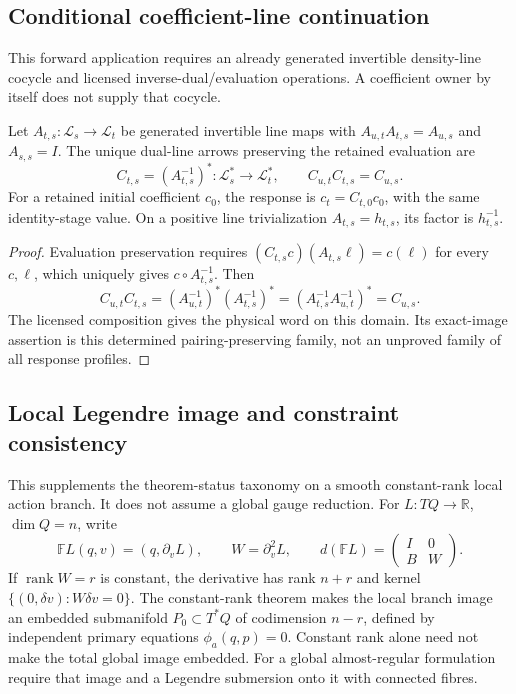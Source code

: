 \documentclass[11pt,a4paper]{article}
\begin{document}
\subsection{Conditional coefficient-line continuation}
\label{p3a:app:v166-coefficient-continuation}
This forward application requires an already generated invertible
density-line cocycle and licensed inverse-dual/evaluation operations. A
coefficient owner by itself does not supply that cocycle.

\begin{lemma}
\label{p3a:lem:v166-coefficient-dual-continuation}
Let \(A_{t,s}:\mathcal L_s\to\mathcal L_t\) be generated invertible
line maps with \(A_{u,t}A_{t,s}=A_{u,s}\) and \(A_{s,s}=I\). The
unique dual-line arrows preserving the retained evaluation are
\[
 C_{t,s}=(A_{t,s}^{-1})^*:\mathcal L_s^*\to\mathcal L_t^*,\qquad
 C_{u,t}C_{t,s}=C_{u,s}.
\]
For a retained initial coefficient \(c_0\), the response is
\(c_t=C_{t,0}c_0\), with the same identity-stage value. On a positive
line trivialization \(A_{t,s}=h_{t,s}\), its factor is \(h_{t,s}^{-1}\).
\end{lemma}
\begin{proof}
Evaluation preservation requires
\((C_{t,s}c)(A_{t,s}\ell)=c(\ell)\) for every \(c,\ell\), which
uniquely gives \(c\circ A_{t,s}^{-1}\). Then
\[
 C_{u,t}C_{t,s}
 =(A_{u,t}^{-1})^*(A_{t,s}^{-1})^*
 =(A_{t,s}^{-1}A_{u,t}^{-1})^*=C_{u,s}.
\]
The licensed composition gives the physical word on this domain. Its
exact-image assertion is this determined pairing-preserving family, not an
unproved family of all response profiles.
\end{proof}

\subsection{Local Legendre image and constraint consistency}
\label{p3a:app:v166-legendre-image}
This supplements the theorem-status taxonomy on a smooth constant-rank local
action branch. It does not assume a global gauge reduction.
For \(L:TQ\to\mathbb R\), \(\dim Q=n\), write
\[
 \mathbb FL(q,v)=(q,\partial_v L),\qquad
 W=\partial_v^2L,\qquad
 d(\mathbb FL)=\begin{pmatrix}I&0\\B&W\end{pmatrix}.
\]
If \(\operatorname{rank}W=r\) is constant, the derivative has rank
\(n+r\) and kernel \(\{(0,\delta v):W\delta v=0\}\). The
constant-rank theorem makes the local branch image an embedded submanifold
\(P_0\subset T^*Q\) of codimension \(n-r\), defined by independent
primary equations \(\phi_a(q,p)=0\). Constant rank alone need not make
the total global image embedded. For a global almost-regular formulation
require that image and a Legendre submersion onto it with connected fibres.
\end{document}
